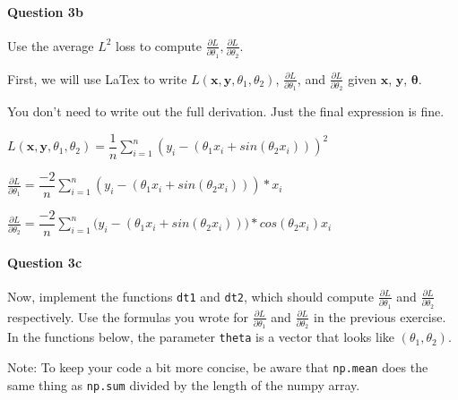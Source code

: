 \documentclass[11pt]{article}
\begin{document}
    \paragraph{Question 3b}\label{question-3b}

Use the average \(L^2\) loss to compute
\(\frac{\partial L }{\partial \theta_1}, \frac{\partial L }{\partial \theta_2}\).

First, we will use LaTex to write
\(L(\textbf{x}, \textbf{y}, \theta_1, \theta_2)\),
\(\frac{\partial L }{\partial \theta_1}\), and
\(\frac{\partial L }{\partial \theta_2}\) given \(\textbf{x}\),
\(\textbf{y}\), \(\boldsymbol{\theta}\).

You don't need to write out the full derivation. Just the final
expression is fine.

    \(L(\textbf{x}, \textbf{y}, \theta_1, \theta_2) = \dfrac{1}{n} \sum_{i = 1}^{n}(y_i - (\theta_1 x_i + sin (\theta_2 x_i)))^2\)

\(\frac{\partial L }{\partial \theta_1} = \dfrac{-2}{n} \sum_{i=1}^{n} (y_i - (\theta_1 x_i + sin (\theta_2 x_i))) * x_i\)

\(\frac{\partial L }{\partial \theta_2} = \dfrac{-2}{n} \sum_{i=1}^{n} \big(y_i - (\theta_1 x_i + sin (\theta_2 x_i))\big) * cos(\theta_2 x_i) x_i\)

    \paragraph{Question 3c}\label{question-3c}

Now, implement the functions \texttt{dt1} and \texttt{dt2}, which should
compute \(\frac{\partial L }{\partial \theta_1}\) and
\(\frac{\partial L }{\partial \theta_2}\) respectively. Use the formulas
you wrote for \(\frac{\partial L }{\partial \theta_1}\) and
\(\frac{\partial L }{\partial \theta_2}\) in the previous exercise. In
the functions below, the parameter \texttt{theta} is a vector that looks
like \(( \theta_1, \theta_2 )\).

Note: To keep your code a bit more concise, be aware that
\texttt{np.mean} does the same thing as \texttt{np.sum} divided by the
length of the numpy array.
\end{document}
